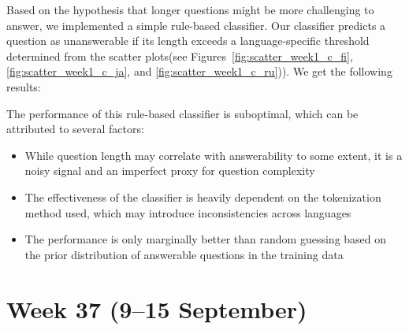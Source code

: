 \documentclass[11pt]{article}
\begin{document}
\begin{enumerate}
    Based on the hypothesis that longer questions might be more challenging to answer, we implemented a simple rule-based classifier. 
    Our classifier predicts a question as unanswerable if its length exceeds a language-specific threshold determined from the scatter plots(see Figures~\ref{fig:scatter_week1_c_fi}, \ref{fig:scatter_week1_c_ja}, and \ref{fig:scatter_week1_c_ru})). 
    We get the following results:

    \begin{table}[ht]
        \centering
        \caption{Performance metrics of the rule-based classifier on the validation set}
        \label{tab:classifier_performance}
    \end{table}

    The performance of this rule-based classifier is suboptimal, which can be attributed to several factors:
    \begin{itemize}
        \item While question length may correlate with answerability to some extent, it is a noisy signal and an imperfect proxy for question complexity
        \item The effectiveness of the classifier is heavily dependent on the tokenization method used, which may introduce inconsistencies across languages
        \item The performance is only marginally better than random guessing based on the prior distribution of answerable questions in the training data
    \end{itemize}
\end{enumerate}

\section{Week 37 (9--15 September)}
\label{sec:week37}
\end{document}
